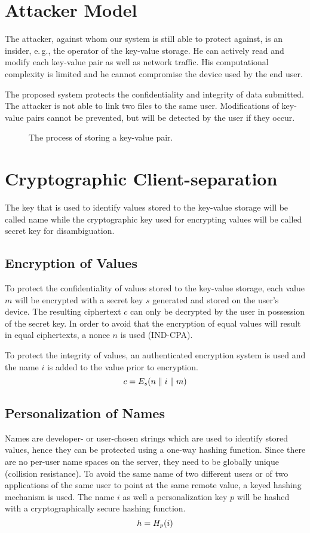 \section{Attacker Model}
The attacker, against whom our system is still able to protect against, is an insider, e.\,g., the operator of the key-value storage.
He can actively read and modify each key-value pair as well as network traffic.
His computational complexity is limited and he cannot compromise the device used by the end user.

The proposed system protects the confidentiality and integrity of data submitted.
The attacker is not able to link two files to the same user.
Modifications of key-value pairs cannot be prevented, but will be detected by the user if they occur.


\begin{figure*}[t]
	\centering
	
	\caption{The process of storing a key-value pair.}%
	\label{fig:storage}
\end{figure*}

\section{Cryptographic Client-separation}
The key that is used to identify values stored to the key-value storage will be called name while the cryptographic key used for encrypting values will be called secret key for disambiguation.

\subsection{Encryption of Values}
To protect the confidentiality of values stored to the key-value storage, each value $m$ will be encrypted with a secret key $s$ generated and stored on the user's device.
The resulting ciphertext $c$ can only be decrypted by the user in possession of the secret key.
In order to avoid that the encryption of equal values will result in equal ciphertexts, a nonce $n$ is used (IND-CPA).

To protect the integrity of values, an authenticated encryption system is used and the name $i$ is added to the value prior to encryption.
\[
	c = \Function{E_{s}}{n \concat i \concat m}
\]

\subsection{Personalization of Names}
Names are developer- or user-chosen strings which are used to identify stored values, hence they can be protected using a one-way hashing function.
Since there are no per-user name spaces on the server, they need to be globally unique (collision resistance).
To avoid the same name of two different users or of two applications of the same user to point at the same remote value, a keyed hashing mechanism is used.
The name $i$ as well a personalization key $p$ will be hashed with a cryptographically secure hashing function.
\[
	h = \Function{H_{p}}{i}
\]

